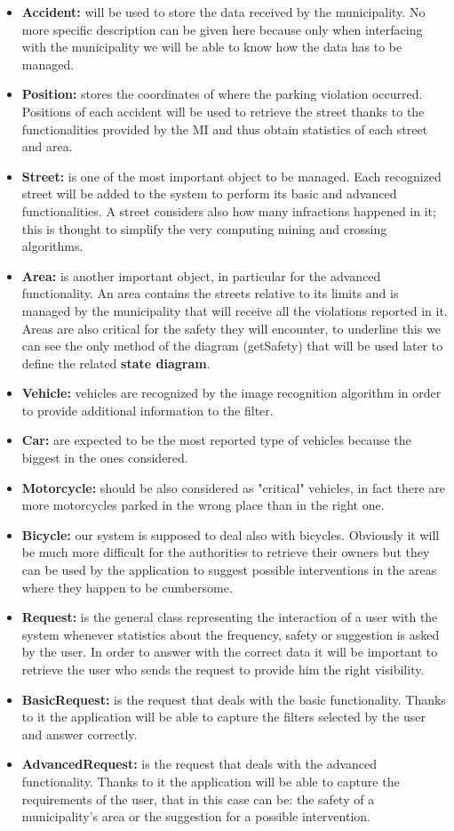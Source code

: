 \begin{itemize}
		\item \textbf{Accident:} will be used to store the data received by the municipality. No more specific description can be given here because only when interfacing with the municipality we will be able to know how the data has to be managed.
		\item \textbf{Position:} stores the coordinates of where the parking violation occurred. Positions of each accident will be used to retrieve the street thanks to the functionalities provided by the MI and thus obtain statistics of each street and area.
		\item \textbf{Street:} is one of the most important object to be managed. Each recognized street will be added to the system to perform its basic and advanced functionalities. A street considers also how many infractions happened in it; this is thought to simplify the very computing mining and crossing algorithms.
		\item \textbf{Area:} is another important object, in particular for the advanced functionality. An area contains the streets relative to its limits and is managed by the municipality that will receive all the violations reported in it. Areas are also critical for the safety they will encounter, to underline this we can see the only method of the diagram (getSafety) that will be used later to define the related \textbf{state diagram}.
		\item \textbf{Vehicle:} vehicles are recognized by the image recognition algorithm in order to provide additional information to the filter. 
		\item \textbf{Car:} are expected to be the most reported type of vehicles because the biggest in the ones considered.
		\item \textbf{Motorcycle:} should be also considered as "critical" vehicles, in fact there are more motorcycles parked in the wrong place than in the right one.
		\item \textbf{Bicycle:} our system is supposed to deal also with bicycles. Obviously it will be much more difficult for the authorities to retrieve their owners but they can be used by the application to suggest possible interventions in the areas where they happen to be cumbersome.
		\item \textbf{Request:} is the general class representing the interaction of a user with the system whenever statistics about the frequency, safety or suggestion is asked by the user. In order to answer with the correct data it will be important to retrieve the user who sends the request to provide him the right visibility.
		\item \textbf{BasicRequest:} is the request that deals with the basic functionality. Thanks to it the application will be able to capture the filters selected by the user and answer correctly.
		\item \textbf{AdvancedRequest:} is the request that deals with the advanced functionality. Thanks to it the application will be able to capture the requirements of the user, that in this case can be: the safety of a municipality's area or the suggestion for a possible intervention.
	\end{itemize}
	
